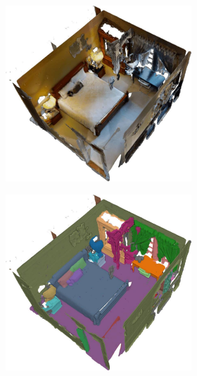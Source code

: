 \begin{figure}[h!]
\begin{subfigure}[b]{\linewidth}
\begin{subfigure}[b]{0.48\linewidth}
		\end{subfigure}
	\caption{}
	\label{fig:matterport-floor-annotation}
	\end{subfigure}
	\newline
	\begin{subfigure}[b]{\linewidth}
		\centering
		\begin{subfigure}[b]{0.32\linewidth}
			\centering
			\includegraphics[width=\textwidth]{images/matterport_room22_color.pdf}
			\caption{}
			\label{fig:matterport_object_annotation_1}
		\end{subfigure}
		\hfil
		\begin{subfigure}[b]{0.32\linewidth}
			\centering
			\includegraphics[width=\textwidth]{images/matterport_room22_instances.pdf}

\end{subfigure}
\end{subfigure}
\end{figure}
